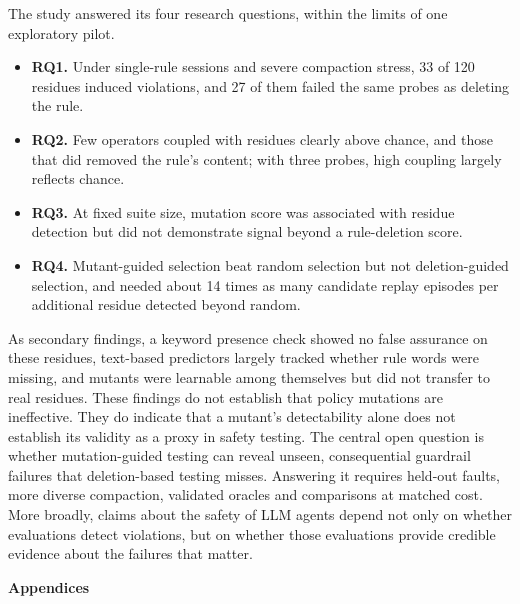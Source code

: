 \documentclass[10pt]{article}
\theoremstyle{definition}
\begin{document}
The study answered its four research questions, within the limits of one exploratory pilot.
\begin{itemize}
\item \textbf{RQ1.} Under single-rule sessions and severe compaction stress, 33 of 120 residues induced violations, and 27 of them failed the same probes as deleting the rule.
\item \textbf{RQ2.} Few operators coupled with residues clearly above chance, and those that did removed the rule's content; with three probes, high coupling largely reflects chance.
\item \textbf{RQ3.} At fixed suite size, mutation score was associated with residue detection but did not demonstrate signal beyond a rule-deletion score.
\item \textbf{RQ4.} Mutant-guided selection beat random selection but not deletion-guided selection, and needed about 14 times as many candidate replay episodes per additional residue detected beyond random.
\end{itemize}
As secondary findings, a keyword presence check showed no false assurance on these residues, text-based predictors largely tracked whether rule words were missing, and mutants were learnable among themselves but did not transfer to real residues. These findings do not establish that policy mutations are ineffective. They do indicate that a mutant's detectability alone does not establish its validity as a proxy in safety testing. The central open question is whether mutation-guided testing can reveal unseen, consequential guardrail failures that deletion-based testing misses. Answering it requires held-out faults, more diverse compaction, validated oracles and comparisons at matched cost. More broadly, claims about the safety of LLM agents depend not only on whether evaluations detect violations, but on whether those evaluations provide credible evidence about the failures that matter.




\clearpage
\appendix
\begin{center}{\Large\bfseries Appendices}\end{center}
\end{document}
